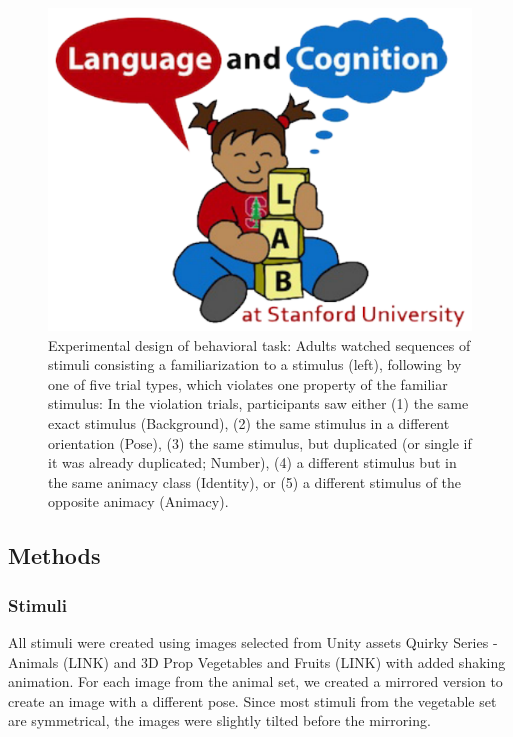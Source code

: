 \documentclass[10pt, letterpaper]{article}
\newenvironment{CodeChunk}{}{}
\begin{document}
\begin{CodeChunk}
\begin{figure}[H]

{\centering \includegraphics{figs/design_fig-1} 

}

\caption[Experimental design of behavioral task]{Experimental design of behavioral task: Adults watched sequences of stimuli consisting a familiarization to a stimulus (left), following by one of five trial types, which violates one property of the familiar stimulus: In the violation trials, participants saw either (1) the same exact stimulus (Background), (2) the same stimulus in a different orientation (Pose), (3) the same stimulus, but duplicated (or single if it was already duplicated; Number), (4) a different stimulus but in the same animacy class (Identity), or (5) a different stimulus of the opposite animacy (Animacy).}\label{fig:design_fig}
\end{figure}
\end{CodeChunk}

\hypertarget{methods}{%
\subsection{Methods}\label{methods}}

\hypertarget{stimuli}{%
\subsubsection{Stimuli}\label{stimuli}}

All stimuli were created using images selected from Unity assets Quirky
Series - Animals (LINK) and 3D Prop Vegetables and Fruits (LINK) with
added shaking animation. For each image from the animal set, we created
a mirrored version to create an image with a different pose. Since most
stimuli from the vegetable set are symmetrical, the images were slightly
tilted before the mirroring.
\end{document}
